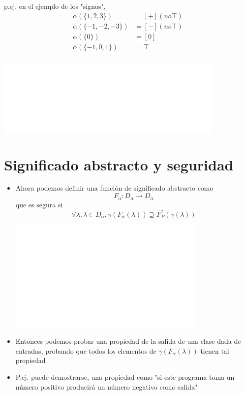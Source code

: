\documentclass[11pt]{article}
\begin{document}
p.ej. en el ejemplo de los "signos", \[
  \begin{align}
       \alpha(\{1, 2, 3\}) &= [+] (no \top) \\
       \alpha(\{- 1, −2, −3\}) &= [-] (no \top) \\
       \alpha(\{0\}) &= [0] \\
       \alpha(\{- 1, 0, 1\}) &= \top \\
     \end{align} \]
  \begin{center}
\includegraphics[width=.9\linewidth]{alphagamma2.png}
\end{center}


\section*{Significado abstracto y seguridad}
\label{sec:org4be91d5}
\begin{itemize}
\item Ahora podemos definir una función de significado abstracto como
$$F_\alpha : D_\alpha \rightarrow D_\alpha$$ que es segura si
$$\forall \lambda, \lambda \in D_\alpha, \gamma(F_\alpha(\lambda))
  \supseteq F^*_P(\gamma(\lambda))$$
	   \begin{center}
\includegraphics[width=.9\linewidth]{absmean2.png}
\end{center}
\item Entonces podemos probar una propiedad de la salida de una clase
dada de entradas, probando que todos los
elementos de \(\gamma(F_\alpha(\lambda))\) tienen tal propiedad
\item P.ej. puede demostrarse, una propiedad como "si este programa toma
un número positivo producirá un número negativo como salida"
\end{itemize}
\end{document}
